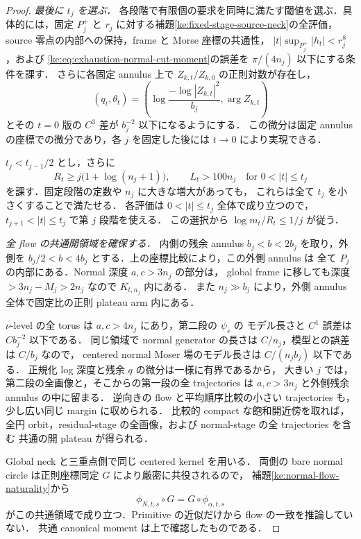 \begin{proof}
\emph{最後に $t_j$ を選ぶ．}
各段階で有限個の要求を同時に満たす閾値を選ぶ．具体的には，固定 $P_j^+$ と
$r_j$ に対する補題\ref{ke:fixed-stage-source-neck}の全評価，
source 零点の内部への保持，frame と Morse 座標の共通性，
$|t|\sup_{P_j^+}|h_t|<r_j^8$，および
\eqref{ke:eq:exhaustion-normal-cut-moment}の誤差を $\pi/(4n_j)$ 以下にする条件を課す．
さらに各固定 annulus 上で $Z_{k,t}/Z_{k,0}$ の正則対数が存在し，
\[
 (q_t,\theta_t)=
 \left(\log\frac{-\log|Z_{k,t}|^2}{b_j},\arg Z_{k,t}\right)
\]
とその $t=0$ 版の $C^3$ 差が $b_j^{-2}$ 以下になるようにする．
この微分は固定 annulus の座標での微分であり，各 $j$ を固定した後には
$t\to0$ により実現できる．

$t_j<t_{j-1}/2$ とし，さらに
\[
 R_t\ge j\bigl(1+\log(n_j+1)\bigr),\qquad
 L_t>100n_j
 \quad\text{for }0<|t|\le t_j
\]
を課す．固定段階の定数や $n_j$ に大きな増大があっても，
これらは全て $t_j$ を小さくすることで満たせる．
各評価は $0<|t|\le t_j$ 全体で成り立つので，
$t_{j+1}<|t|\le t_j$ で第 $j$ 段階を使える．
この選択から $\log m_t/R_t\le1/j$ が従う．

\emph{全 flow の共通開領域を確保する．}
内側の残余 annulus $b_j<b<2b_j$ を取り，外側を
$b_j/2<b<4b_j$ とする．上の座標比較により，この外側 annulus は
全て $P_j$ の内部にある．Normal 深度 $a,c>3n_j$ の部分は，
global frame に移しても深度 $>3n_j-M_j>2n_j$ なので $K_{t,n_j}$ 内にある．
また $n_j\gg b_j$ により，外側 annulus 全体で固定比の正則 plateau arm 内にある．

$\nu$-level の全 torus は $a,c>4n_j$ にあり，第二段の $\psi_s$ の
モデル長さと $C^1$ 誤差は $Cb_j^{-2}$ 以下である．
同じ領域で normal generator の長さは $C/n_j$，模型との誤差は $C/b_j$ なので，
centered normal Moser 場のモデル長さは $C/(n_jb_j)$ 以下である．
正規化 log 深度と残余 $q$ の微分は一様に有界であるから，
大きい $j$ では，第二段の全画像と，そこからの第一段の全 trajectories は
$a,c>3n_j$ と外側残余 annulus の中に留まる．
逆向きの flow と平均順序比較の小さい trajectories も，少し広い同じ margin に収められる．
比較的 compact な飽和開近傍を取れば，
全円 orbit，residual-stage の全画像，および normal-stage の全 trajectories を含む
共通の開 plateau が得られる．

Global neck と三重点側で同じ centered kernel を用いる．
両側の bare normal circle は正則座標同定 $G$ により厳密に共役されるので，
補題\ref{ke:normal-flow-naturality}から
\[
 \phi_{N,t,s}\circ G=G\circ\phi_{\alpha,t,s}
\]
がこの共通領域で成り立つ．Primitive の近似だけから flow の一致を推論していない．
共通 canonical moment は上で確認したものである．


\end{proof}
